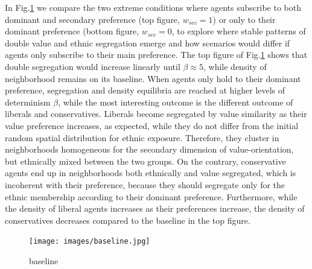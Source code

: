 \documentclass[
]{article}
\begin{document}
In Fig.\ref{fig:bsl} we compare the two extreme conditions where agents subscribe to both dominant and secondary preference (top figure, $w_{sec} = 1$) or only to their dominant preference (bottom figure, $w_{sec} = 0$, to explore where stable patterns of double value and ethnic segregation emerge and how scenarios would differ if agents only subscribe to their main preference. The top figure of Fig.\ref{fig:bsl} shows that double segregation would increase linearly until $\beta \approx 5$, while density of neighborhood remains on its baseline. When agents only hold to their dominant preference, segregation and density equilibria are reached at higher levels of determinism $\beta$, while the most interesting outcome is the different outcome of liberals and conservatives. Liberals become segregated by value similarity as their value preference increases, as expected, while they do not differ from the initial random spatial distribution for ethnic exposure. Therefore, they cluster in neighborhoods homogeneous for the secondary dimension of value-orientation, but ethnically mixed between the two groups. On the contrary, conservative agents end up in neighborhoods both ethnically and value segregated, which is incoherent with their preference, because they should segregate only for the ethnic membership according to their  dominant preference. Furthermore, while the density of liberal agents increases as their preferences increase, the density of conservatives decreases compared to the baseline in the top figure.

\begin{figure}[H]
    \centering
    \texttt{[image: images/baseline.jpg]}
    \caption{baseline}
    \label{fig:bsl}
\end{figure}
\end{document}
